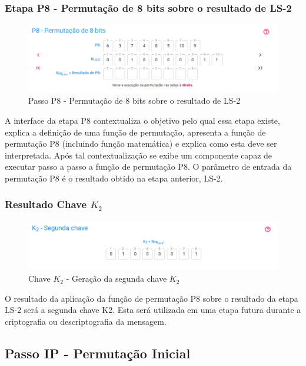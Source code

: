 \subsubsection{Etapa P8 - Permutação de 8 bits sobre o resultado de LS-2}

\begin{figure}[H]
    \centering
    \caption{Passo P8 - Permutação de 8 bits sobre o resultado de LS-2}
    \includegraphics[width=1\linewidth]{UI/UIP82.png}
\end{figure}

A interface da etapa P8 contextualiza o objetivo pelo qual essa etapa existe, explica a definição de uma função de permutação, apresenta a função de permutação P8 (incluindo função matemática) e explica como esta deve ser interpretada. Após tal contextualização se exibe um componente capaz de executar passo a passo a função de permutação P8. O parâmetro de entrada da permutação P8 é o resultado obtido na etapa anterior, LS-2.

\subsubsection{Resultado Chave \(K_2\)}

\begin{figure}[H]
    \centering
    \caption{Chave \(K_2\) - Geração da segunda chave \(K_2\)}
    \includegraphics[width=1\linewidth]{UI/UIK2.png}
\end{figure}

O resultado da aplicação da função de permutação P8 sobre o resultado da etapa LS-2 será a segunda chave K2. Esta será utilizada em uma etapa futura durante a criptografia ou descriptografia da mensagem.

\subsection{Passo IP - Permutação Inicial}

